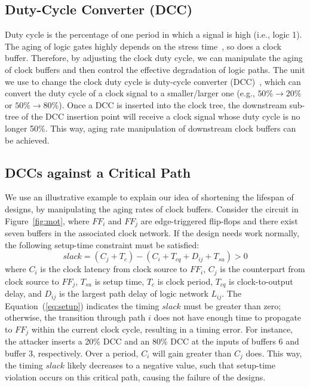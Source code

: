 \subsection{Duty-Cycle Converter (DCC)}
Duty cycle is the percentage of one period in which a signal is high (i.e., logic 1). The aging of logic gates highly depends on the stress time~\cite{wang2010impact}, so does a clock buffer. %
Therefore, by adjusting the clock duty cycle, we can manipulate the aging of clock buffers and then control the effective degradation of logic paths. The unit we use to change the clock duty cycle is duty-cycle converter (DCC)~\cite{wu2018maui}, which can convert the duty cycle of a clock signal to a smaller/larger one (e.g., $50\% \rightarrow 20\%$ or $50\% \rightarrow 80\%$). Once a DCC is inserted into the clock tree, the downstream sub-tree of the DCC insertion point will receive a clock signal whose duty cycle is no longer 50\%. This way, aging rate manipulation of downstream clock buffers can be achieved.
\subsection{DCCs against a Critical Path}
We use an illustrative example to explain our idea of shortening the lifespan of designs, by manipulating the aging rates of clock buffers. Consider the circuit in Figure~\ref{fig:mot}, where $FF_{i}$ and $FF_{j}$ are edge-triggered flip-flops and there exist seven buffers in the associated clock network. If the design needs work normally, the following setup-time constraint must be satisfied:
\begin{equation}
	\label{eq:setup}
	slack = (C_{j} + T_{c}) - (C_{i}  + T_{cq} + D_{ij} + T_{su}) > 0 
\end{equation}
where $C_{i}$ is the clock latency from clock source to $FF_{i}$, $C_{j}$ is the counterpart from clock source to $FF_{j}$, $T_{su}$ is setup time, $T_{c}$ is clock period, $T_{cq}$ is clock-to-output delay, and $D_{ij}$ is the largest path delay of logic network $L_{ij}$. The Equation~(\ref{eq:setup}) indicates the timing $slack$ must be greater than zero; otherwise, the transition through path $i$ does not have enough time to propagate to $FF_{j}$ within the current clock cycle, resulting in a timing error. For instance, the attacker inserts a 20\% DCC and an 80\% DCC at the inputs of buffers 6 and buffer 3, respectively. Over a period, $C_{i}$ will gain greater than $C_{j}$ does. This way, the timing $slack$ likely decreases to a negative value, such that setup-time violation occurs on this critical path, causing the failure of the designs.